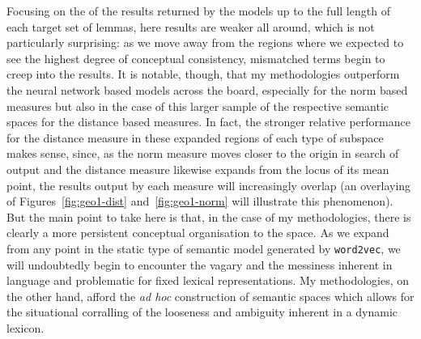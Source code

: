 Focusing on the   of the results returned by the models up to the full length of each target set of lemmas, here results are weaker all around, which is not particularly surprising: as we move away from the regions where we expected to see the highest degree of conceptual consistency, mismatched terms begin to creep into the results.  It is notable, though, that my methodologies outperform the neural network based models across the board, especially for the norm based measures but also in the case of this larger sample of the respective semantic spaces for the distance based measures.  In fact, the stronger relative performance for the distance measure in these expanded regions of each type of subspace makes sense, since, as the norm measure moves closer to the origin in search of output and the distance measure likewise expands from the locus of its mean point, the results output by each measure will increasingly overlap (an overlaying of Figures~\ref{fig:geo1-dist} and~\ref{fig:geo1-norm} will illustrate this phenomenon).  But the main point to take here is that, in the case of my methodologies, there is clearly a more persistent conceptual organisation to the space.  As we expand from any point in the static type of semantic model generated by \texttt{word2vec}, we will undoubtedly begin to encounter the vagary and the messiness inherent in language and problematic for fixed lexical representations.  My methodologies, on the other hand, afford the \emph{ad hoc} construction of semantic spaces which allows for the situational corralling of the looseness and ambiguity inherent in a dynamic lexicon.

